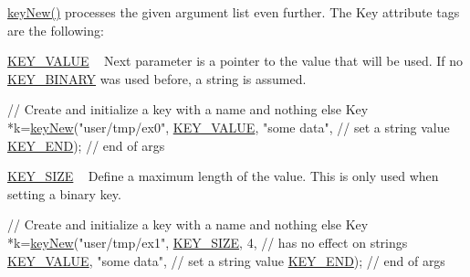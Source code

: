 \hyperlink{group__key_gad23c65b44bf48d773759e1f9a4d43b89}{key\+New()} processes the given argument list even further. The Key attribute tags are the following\+:
\begin{DoxyItemize}
\item \hyperlink{group__key_gga91fb3178848bd682000958089abbaf40ac66e4a49d09212b79f5754ca6db5bd2e}{K\+E\+Y\+\_\+\+V\+A\+L\+U\+E} ~\newline
 Next parameter is a pointer to the value that will be used. If no \hyperlink{group__key_gga91fb3178848bd682000958089abbaf40a1ca18d4e094ae7487d35ecedda2235ff}{K\+E\+Y\+\_\+\+B\+I\+N\+A\+R\+Y} was used before, a string is assumed. 
\begin{DoxyCodeInclude}
\textcolor{comment}{// Create and initialize a key with a name and nothing else}
Key *k=\hyperlink{group__key_gad23c65b44bf48d773759e1f9a4d43b89}{keyNew}(\textcolor{stringliteral}{"user/tmp/ex0"},
        \hyperlink{group__key_gga91fb3178848bd682000958089abbaf40ac66e4a49d09212b79f5754ca6db5bd2e}{KEY\_VALUE}, \textcolor{stringliteral}{"some data"},    \textcolor{comment}{// set a string value}
        \hyperlink{group__key_gga91fb3178848bd682000958089abbaf40aa8adb6fcb92dec58fb19410eacfdd403}{KEY\_END});                  \textcolor{comment}{// end of args}
\end{DoxyCodeInclude}

\item \hyperlink{group__key_gga91fb3178848bd682000958089abbaf40a6d531b5c41445d19d0452eebdccbfa01}{K\+E\+Y\+\_\+\+S\+I\+Z\+E} ~\newline
 Define a maximum length of the value. This is only used when setting a binary key. 
\begin{DoxyCodeInclude}
\textcolor{comment}{// Create and initialize a key with a name and nothing else}
Key *k=\hyperlink{group__key_gad23c65b44bf48d773759e1f9a4d43b89}{keyNew}(\textcolor{stringliteral}{"user/tmp/ex1"},
        \hyperlink{group__key_gga91fb3178848bd682000958089abbaf40a6d531b5c41445d19d0452eebdccbfa01}{KEY\_SIZE}, 4,               \textcolor{comment}{// has no effect on strings}
        \hyperlink{group__key_gga91fb3178848bd682000958089abbaf40ac66e4a49d09212b79f5754ca6db5bd2e}{KEY\_VALUE}, \textcolor{stringliteral}{"some data"},    \textcolor{comment}{// set a string value}
        \hyperlink{group__key_gga91fb3178848bd682000958089abbaf40aa8adb6fcb92dec58fb19410eacfdd403}{KEY\_END});                  \textcolor{comment}{// end of args}
\end{DoxyCodeInclude}


\end{DoxyItemize}
